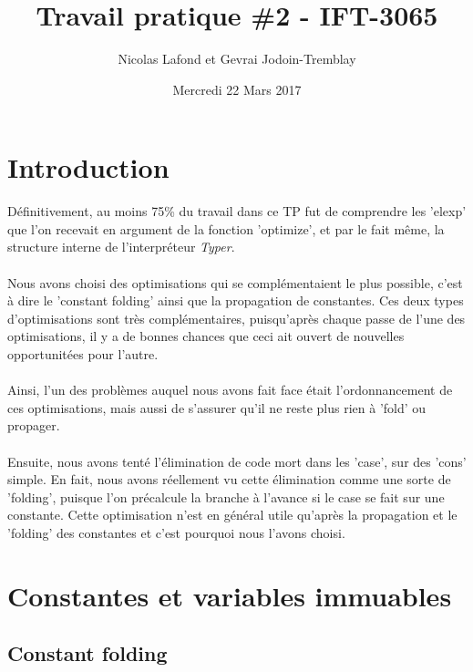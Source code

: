 \documentclass{article}
\begin{document}
\title{Travail pratique \#2 - IFT-3065}
\author{Nicolas Lafond et Gevrai Jodoin-Tremblay}
\date{Mercredi 22 Mars 2017}
\maketitle

\section{Introduction}

Définitivement, au moins 75\% du travail dans ce TP fut de comprendre les
'elexp' que l'on recevait en argument de la fonction 'optimize', et par
le fait même, la structure interne de l'interpréteur \emph{Typer}.

\paragraph{}
Nous avons choisi des optimisations qui se complémentaient le plus possible,
c'est à dire le 'constant folding' ainsi que la propagation de constantes.
Ces deux types d'optimisations sont très complémentaires, puisqu'après chaque
passe de l'une des optimisations, il y a de bonnes chances que ceci ait ouvert
de nouvelles opportunitées pour l'autre.

\paragraph{}
Ainsi, l'un des problèmes auquel nous avons fait face était l'ordonnancement
de ces optimisations, mais aussi de s'assurer qu'il ne reste plus rien à
'fold' ou propager.

\paragraph{}
Ensuite, nous avons tenté l'élimination de code mort dans les 'case', sur des
'cons' simple. En fait, nous avons réellement vu cette élimination comme
une sorte de 'folding', puisque l'on précalcule la branche à l'avance si le
case se fait sur une constante. Cette optimisation n'est en général utile
qu'après la propagation et le 'folding' des constantes et c'est pourquoi nous 
l'avons choisi.

\section{Constantes et variables immuables}
\subsection{Constant folding}
\end{document}
